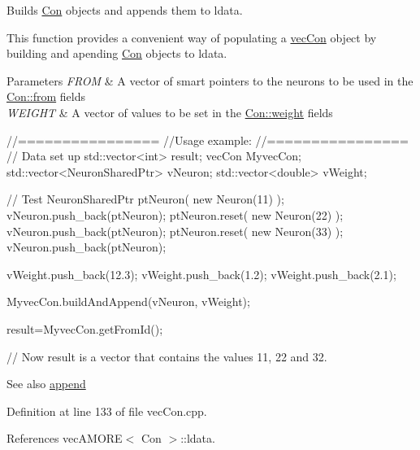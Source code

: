 Builds \hyperlink{class_con}{Con} objects and appends them to ldata. 

This function provides a convenient way of populating a \hyperlink{classvec_con}{vecCon} object by building and apending \hyperlink{class_con}{Con} objects to ldata. 
\begin{DoxyParams}{Parameters}
{\em FROM} & A vector of smart pointers to the neurons to be used in the \hyperlink{class_con_a40215fdb25f3b2ed66e965df558e86e2}{Con::from} fields \\
\hline
{\em WEIGHT} & A vector of values to be set in the \hyperlink{class_con_a7f46485ba5b41971ea38641f9e7d1be0}{Con::weight} fields\\
\hline
\end{DoxyParams}

\begin{DoxyCode}
  //================
  //Usage example:
  //================
 // Data set up
                std::vector<int> result;
                vecCon MyvecCon;
                std::vector<NeuronSharedPtr> vNeuron;
                std::vector<double> vWeight;


                // Test
                NeuronSharedPtr ptNeuron( new Neuron(11) );
                vNeuron.push_back(ptNeuron);
                ptNeuron.reset( new Neuron(22) );
                vNeuron.push_back(ptNeuron);
                ptNeuron.reset( new Neuron(33) );
                vNeuron.push_back(ptNeuron);

                vWeight.push_back(12.3);
                vWeight.push_back(1.2);
                vWeight.push_back(2.1);

                MyvecCon.buildAndAppend(vNeuron, vWeight);

                result=MyvecCon.getFromId();

        // Now result is a vector that contains the values 11, 22 and 32.
\end{DoxyCode}


\begin{DoxySeeAlso}{See also}
\hyperlink{classvec_a_m_o_r_e_ab060ffa67e85997fc4236bedfd2f17b6}{append} 
\end{DoxySeeAlso}


Definition at line 133 of file vecCon.cpp.



References vecAMORE$<$ Con $>$::ldata.


